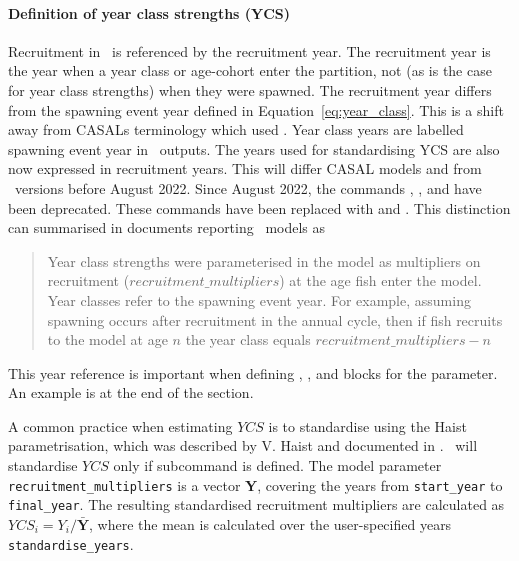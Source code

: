 \paragraph*{Definition of year class strengths (YCS)}

Recruitment in \CNAME\ is referenced by the recruitment year. The recruitment year is the year when a year class or age-cohort enter the partition, not (as is the case for year class strengths) when they were spawned. The recruitment year differs from the spawning event year defined in Equation~\eqref{eq:year_class}. This is a shift away from CASALs terminology which used . Year class years are labelled spawning event year in \CNAME\ outputs. The years used for standardising YCS are also now expressed in recruitment years. This will differ CASAL models and from \CNAME\ versions before August 2022. Since August 2022, the commands , , and  have been deprecated. These commands have been replaced with  and . This distinction can summarised in documents reporting \CNAME\ models as \begin{quote}Year class strengths were parameterised in the model as multipliers on recruitment ($recruitment\_multipliers$) at the age fish enter the model. Year classes refer to the spawning event year. For example, assuming spawning occurs after recruitment in the annual cycle, then if fish recruits to the model at age $n$ the year class equals $recruitment\_multipliers - n$\end{quote}

This year reference is important when defining , , and  blocks for the  parameter. An example is at the end of the section.

A common practice when estimating $YCS$ is to standardise using the Haist parametrisation, which was described by V. Haist and documented in \cite{1388}. \CNAME\ will standardise $YCS$ only if subcommand  is defined. The model parameter \texttt{recruitment\_multipliers} is a vector \textbf{Y}, covering the years from \texttt{start\_year} to \texttt{final\_year}. The resulting standardised recruitment multipliers are calculated as $YCS_i=Y_i/\bar{\textbf{Y}}$, where the mean is calculated over the user-specified years \texttt{standardise\_years}.

